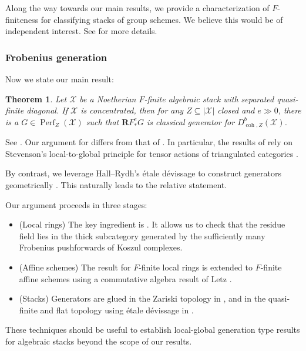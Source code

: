 \documentclass[11pt]{amsart}
\theoremstyle{plain}
\newtheorem{theorem}{Theorem}[section]
\theoremstyle{definition}
\numberwithin{equation}{section}
\numberwithin{theorem}{section}
\begin{document}
Along the way towards our main results, we provide a characterization of $F$-finiteness for classifying stacks of group schemes. 
We believe this would be of independent interest. 
See  for more details. 

\subsubsection{Frobenius generation}
\label{sec:intro_what_we_do_frob_gen}

Now we state our main result:

\begin{theorem}
    \label{introthm:Frobenius_generation}
    Let $\mathcal{X}$ be a Noetherian $F$-finite algebraic stack with separated quasi-finite diagonal. 
    If $\mathcal{X}$ is concentrated, then for any $Z\subseteq |\mathcal{X}|$ closed and $e \gg 0$, there is a $G\in \operatorname{Perf}_Z (\mathcal{X})$ such that $\mathbf{R} F_\ast^e G$ is classical generator for $D^b_{\operatorname{coh},Z}(\mathcal{X})$.
\end{theorem}

See . Our argument for  differs from that of \cite[Theorem A]{Ballard/Iyengar/Lank/Mukhopadhyay/Pollitz:2023}.
In particular, the results of \cite{Ballard/Iyengar/Lank/Mukhopadhyay/Pollitz:2023} rely on Stevenson's local-to-global principle for tensor actions of triangulated categories \cite{Stevenson:2014a}. 

By contrast, we leverage Hall--Rydh's \'{e}tale d\'{e}vissage to construct generators geometrically \cite{Hall/Rydh:2018}.
This naturally leads to the relative statement. 

Our argument proceeds in three stages:
\begin{itemize}
    \item (Local rings) The key ingredient is \cite[Theorem 4.1.13]{Bhatt/Blickle/Schwede/Tucker:2026}. It allows us to check that the residue field lies in the thick subcategory generated by the sufficiently many Frobenius pushforwards of Koszul complexes. 
    \item (Affine schemes) The result for $F$-finite local rings is extended to $F$-finite affine schemes using a commutative algebra result of Letz \cite{Letz:2021}.
    \item (Stacks) Generators are glued in the Zariski topology in , and in the quasi-finite and flat topology using \'{e}tale d\'{e}vissage in . 
\end{itemize}
These techniques should be useful to establish local-global generation type results for algebraic stacks beyond the scope of our results. 
\end{document}
